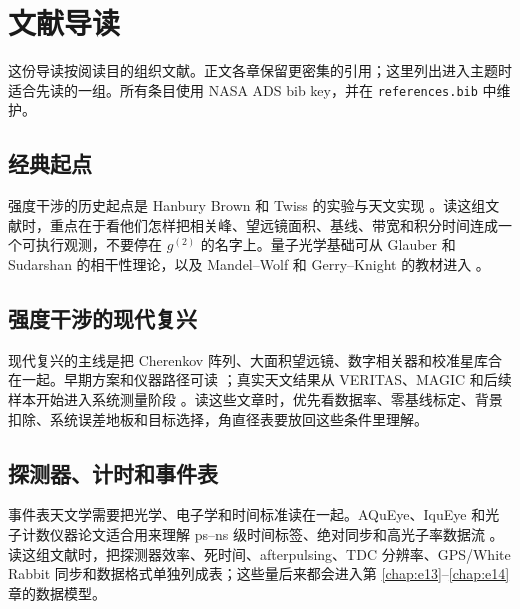 \chapter{文献导读}
\label{app:g}

这份导读按阅读目的组织文献。正文各章保留更密集的引用；这里列出进入主题时适合先读的一组。所有条目使用 NASA ADS bib key，并在 \texttt{references.bib} 中维护。

\section{经典起点}
\label{appsec:g-classic}

强度干涉的历史起点是 Hanbury Brown 和 Twiss 的实验与天文实现 \citep{1956Natur.178.1046H,1957RSPSA.242..300B,1974iiia.book.....H}。读这组文献时，重点在于看他们怎样把相关峰、望远镜面积、基线、带宽和积分时间连成一个可执行观测，不要停在 \(g^{(2)}\) 的名字上。量子光学基础可从 Glauber 和 Sudarshan 的相干性理论，以及 Mandel--Wolf 和 Gerry--Knight 的教材进入 \citep{1963PhRv..130.2529G,1963PhRvL..10..277S,1995ocqo.book.....M,1985stop.book.....G}。

\section{强度干涉的现代复兴}
\label{appsec:g-sii}

现代复兴的主线是把 Cherenkov 阵列、大面积望远镜、数字相关器和校准星库合在一起。早期方案和仪器路径可读 \citet{2009A&A...508..531N,2017MNRAS.472.4126G}；真实天文结果从 VERITAS、MAGIC 和后续样本开始进入系统测量阶段 \citep{2020NatAs...4.1164A,2021MNRAS.506.1585Z,2022MNRAS.512.1722K,2024MNRAS.529.4387A,2024ApJ...966...28A,2025ApJ...995..191A}。读这些文章时，优先看数据率、零基线标定、背景扣除、系统误差地板和目标选择，角直径表要放回这些条件里理解。

\section{探测器、计时和事件表}
\label{appsec:g-instrument}

事件表天文学需要把光学、电子学和时间标准读在一起。AQuEye、IquEye 和光子计数仪器论文适合用来理解 ps--ns 级时间标签、绝对同步和高光子率数据流 \citep{2015SPIE.9504E..0CZ,2016SPIE.9907E..0NZ,2013NIMPA.725..187J,2020RScI...91a3108W}。读这组文献时，把探测器效率、死时间、afterpulsing、TDC 分辨率、GPS/White Rabbit 同步和数据格式单独列成表；这些量后来都会进入第 \ref{chap:e13}--\ref{chap:e14} 章的数据模型。

